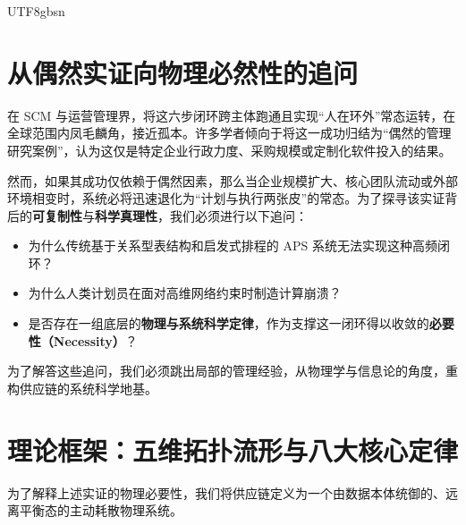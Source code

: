 \documentclass[11pt,a4paper]{article}
\begin{document}
\begin{CJK*}{UTF8}{gbsn}
\section{从偶然实证向物理必然性的追问}
在 SCM 与运营管理界，将这六步闭环跨主体跑通且实现“人在环外”常态运转，在全球范围内凤毛麟角，接近孤本。许多学者倾向于将这一成功归结为“偶然的管理研究案例”，认为这仅是特定企业行政力度、采购规模或定制化软件投入的结果。

然而，如果其成功仅依赖于偶然因素，那么当企业规模扩大、核心团队流动或外部环境相变时，系统必将迅速退化为“计划与执行两张皮”的常态。为了探寻该实证背后的\textbf{可复制性}与\textbf{科学真理性}，我们必须进行以下追问：
\begin{itemize}
    \item 为什么传统基于关系型表结构和启发式排程的 APS 系统无法实现这种高频闭环？
    \item 为什么人类计划员在面对高维网络约束时制造计算崩溃？
    \item 是否存在一组底层的\textbf{物理与系统科学定律}，作为支撑这一闭环得以收敛的\textbf{必要性（Necessity）}？
\end{itemize}

为了解答这些追问，我们必须跳出局部的管理经验，从物理学与信息论的角度，重构供应链的系统科学地基。

\section{理论框架：五维拓扑流形与八大核心定律}
为了解释上述实证的物理必要性，我们将供应链定义为一个由数据本体统御的、远离平衡态的主动耗散物理系统。


\end{CJK*}
\end{document}
